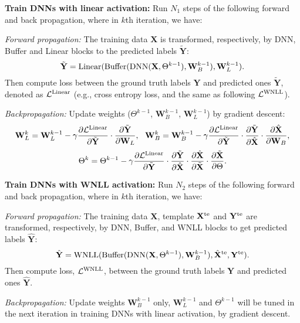 \documentclass{article}
\begin{document}
{\bf Train DNNs with linear activation: } Run $N_1$ steps of the following forward and back propagation, where in $k$th iteration, we have:

{\it Forward propagation: } The training data $\mathbf{X}$ is transformed, respectively, by DNN, Buffer and Linear blocks to the predicted labels $\tilde{\mathbf{Y}}$:
$$\tilde{\mathbf{Y}} = {\rm Linear}({\rm Buffer}({\rm DNN}(\mathbf{X}, \Theta^{k-1}), \mathbf{W}_B^{k-1}), \mathbf{W}_L^{k-1}).$$
Then compute loss between the ground truth labels $\mathbf{Y}$ and predicted ones $\tilde{\mathbf{Y}}$, denoted as $\mathcal{L}^{\rm Linear}$ (e.g., cross entropy loss, and the same as following $\mathcal{L}^{\rm WNLL}$).

{\it Backpropagation: } Update weights ($\Theta^{k-1}$, $\mathbf{W}_B^{k-1}$, $\mathbf{W}_L^{k-1}$) by gradient descent:
$$
\mathbf{W}_L^k = \mathbf{W}_L^{k-1} - \gamma \frac{\partial \mathcal{L}^{\rm Linear}}{\partial \tilde{\mathbf{Y}}}\cdot \frac{\partial \tilde{\mathbf{Y}}}{\partial \mathbf{W}_L},\ \ \mathbf{W}_B^k = \mathbf{W}_B^{k-1} - \gamma \frac{\partial \mathcal{L}^{\rm Linear}}{\partial \tilde{\mathbf{Y}}}\cdot \frac{\partial \tilde{\mathbf{Y}}}{\partial \hat{\mathbf{X}}}\cdot \frac{\partial \hat{\mathbf{X}}}{\partial \mathbf{W}_B},
$$
$$
\Theta^k = \Theta^{k-1} - \gamma \frac{\partial \mathcal{L}^{\rm Linear}}{\partial \tilde{\mathbf{Y}}}\cdot \frac{\partial \tilde{\mathbf{Y}}}{\partial \hat{\mathbf{X}}}\cdot \frac{\partial \hat{\mathbf{X}}}{\partial \tilde{\mathbf{X}}}\cdot \frac{\partial \tilde{\mathbf{X}}}{\partial \Theta}.
$$


{\bf Train DNNs with WNLL activation: } Run $N_2$ steps of the following forward and back propagation, where in $k$th iteration, we have:

{\it Forward propagation: } The training data $\mathbf{X}$, template $\mathbf{X}^{\rm te}$ and $\mathbf{Y}^{\rm te}$ are transformed, respectively, by DNN, Buffer, and WNLL blocks to get predicted labels $\hat{\mathbf{Y}}$:
$$\hat{\mathbf{Y}} = {\rm WNLL}({\rm Buffer}({\rm DNN}(\mathbf{X}, \Theta^{k-1}), \mathbf{W}_B^{k-1}), \hat{\mathbf{X}}^{\rm te}, \mathbf{Y}^{\rm te}).$$
Then compute loss, $\mathcal{L}^{\rm WNLL}$, between the ground truth labels $\mathbf{Y}$ and predicted ones $\hat{\mathbf{Y}}$.

{\it Backpropagation: } Update weights $\mathbf{W}_B^{k-1}$ only, $\mathbf{W}_L^{k-1}$ and $\Theta^{k-1}$ will be tuned in the next iteration in training DNNs with linear activation, by gradient descent. 
\end{document}

